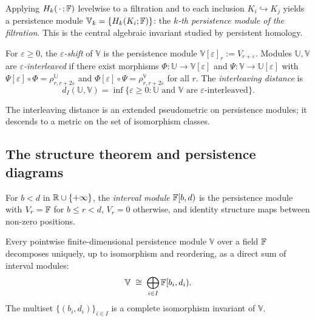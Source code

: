 Applying $H_k(\,\cdot\,;\mathbb{F})$ levelwise to a filtration and to each inclusion $K_i\hookrightarrow K_j$ yields a persistence module $\mathbb{V}_k=\{H_k(K_i;\mathbb{F})\}$: the \emph{$k$-th persistence module of the filtration}. This is the central algebraic invariant studied by persistent homology.

\begin{definition}
\label{def:interleaving}
For $\varepsilon\geq 0$, the \emph{$\varepsilon$-shift} of $\mathbb{V}$ is the persistence module $\mathbb{V}[\varepsilon]_r:=V_{r+\varepsilon}$. Modules $\mathbb{U},\mathbb{V}$ are \emph{$\varepsilon$-interleaved} if there exist morphisms $\Phi\colon\mathbb{U}\to\mathbb{V}[\varepsilon]$ and $\Psi\colon\mathbb{V}\to\mathbb{U}[\varepsilon]$ with $\Psi[\varepsilon]\circ\Phi=\rho^\mathbb{U}_{r,r+2\varepsilon}$ and $\Phi[\varepsilon]\circ\Psi=\rho^\mathbb{V}_{r,r+2\varepsilon}$ for all $r$. The \emph{interleaving distance} is
\[
  d_I(\mathbb{U},\mathbb{V})=\inf\bigl\{\varepsilon\geq 0:\mathbb{U}\text{ and }\mathbb{V}\text{ are }\varepsilon\text{-interleaved}\bigr\}.
\]
\end{definition}

The interleaving distance is an extended pseudometric on persistence modules; it descends to a metric on the set of isomorphism classes.

\subsection{The structure theorem and persistence diagrams}
\label{subsubsec:structure}

\begin{definition}
\label{def:interval-mod}
For $b<d$ in $\mathbb{R}\cup\{+\infty\}$, the \emph{interval module} $\mathbb{F}[b,d)$ is the persistence module with $V_r=\mathbb{F}$ for $b\leq r<d$, $V_r=0$ otherwise, and identity structure maps between non-zero positions.
\end{definition}

\begin{theorem}
\label{thm:structure}
Every pointwise finite-dimensional persistence module $\mathbb{V}$ over a field $\mathbb{F}$ decomposes uniquely, up to isomorphism and reordering, as a direct sum of interval modules:
\begin{equation}
  \mathbb{V}\;\cong\;\bigoplus_{i\in I}\mathbb{F}[b_i,d_i).
  \label{eq:structure}
\end{equation}
The multiset $\{(b_i,d_i)\}_{i\in I}$ is a complete isomorphism invariant of $\mathbb{V}$.
\end{theorem}

